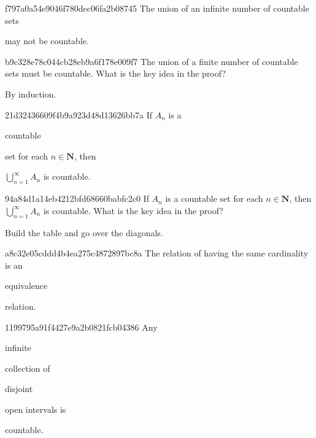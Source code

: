 \begin{note}{f797a0a54e9046f780dec06fa2b08745}
    The union of an infinite number of countable sets \begin{icloze}{1}may not be countable.\end{icloze}
\end{note}

\begin{note}{b9c328e78c044cb28eb9a6f178e009f7}
    The union of a finite number of countable sets must be countable.
    What is the key idea in the proof?

    \begin{cloze}{1}
        By induction.
    \end{cloze}
\end{note}

\begin{note}{21d32436609f4b9a923d48d13626bb7a}
    If \({ A_n }\) is a \begin{icloze}{2}countable\end{icloze} set for each \({ n \in \mathbf{N} }\), then \begin{icloze}{1}\({ \bigcup_{n=1}^{\infty}A_n }\) is countable.\end{icloze}
\end{note}

\begin{note}{94a84d1a14eb4212bfd68660babfc2c0}
    If \({ A_n }\) is a countable set for each \({ n \in \mathbf{N} }\), then \({ \bigcup_{n=1}^{\infty}A_n }\) is countable.
    What is the key idea in the proof?

    \begin{cloze}{1}
        Build the table and go over the diagonals.
    \end{cloze}
\end{note}

\begin{note}{a8c32e05cddd4b4ea275c4872897bc8a}
    The relation of having the same cardinality is an \begin{icloze}{1}equivalence\end{icloze} relation.
\end{note}

\begin{note}{1199795a91f4427e9a2b0821fcb04386}
    Any \begin{icloze}{3}infinite\end{icloze} collection of \begin{icloze}{2}disjoint\end{icloze} open intervals is \begin{icloze}{1}countable.\end{icloze}
\end{note}

